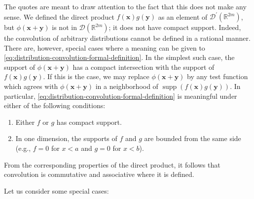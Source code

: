 The quotes are meant to draw attention to the fact that this does not make any sense. We defined the direct product $f(\bm{x})g(\bm{y})$ as an element of $\mathcal{D}^{\prime}(\mathbb{R}^{2m})$, but $\phi(\bm{x}+\bm{y})$ is not in $\mathcal{D}(\mathbb{R}^{2m})$; it does not have compact support. Indeed, the convolution of arbitrary distributions cannot be defined in a rational manner. There are, however, special cases where a meaning can be given to \eqref{eq:distribution-convolution-formal-definition}. In the simplest such case, the support of $\phi(\bm{x}+\bm{y})$ has a compact intersection with the support of $f(\bm{x})g(\bm{y})$. If this is the case, we may replace $\phi(\bm{x}+\bm{y})$ by any test function which agrees with $\phi(\bm{x}+\bm{y})$ in a neighborhood of $\operatorname{supp}(f(\bm{x})g(\bm{y}))$. In particular, \eqref{eq:distribution-convolution-formal-definition} is meaningful under either of the following conditions:
\begin{enumerate}
\item Either $f$ or $g$ has compact support.
\item In one dimension, the supports of $f$ and $g$ are bounded from the same side (e.g., $f=0$ for $x<a$ and $g=0$ for $x<b$).
\end{enumerate}

From the corresponding properties of the direct product, it follows that convolution is commutative and associative where it is defined.

Let us consider some special cases:

